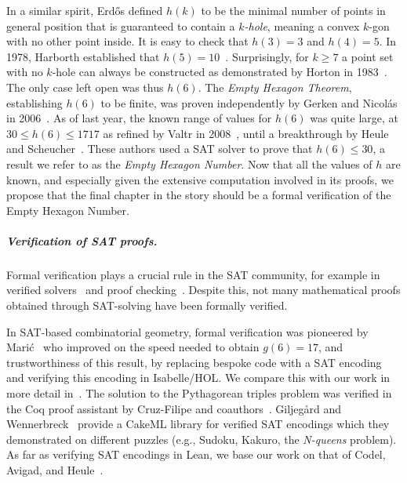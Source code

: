 In a similar spirit,
Erd\H{o}s defined $h(k)$
to be the minimal number of points in general position
that is guaranteed to contain a \emph{$k$-hole},
meaning a convex $k$-gon with no other point inside.
It is easy to check that $h(3) = 3$ and $h(4) = 5$.
In 1978, Harborth established that $h(5) = 10$~\cite{Harborth1978}.
Surprisingly, for $k \geq 7$ a point set with no $k$-hole
can always be constructed
as demonstrated by Horton in 1983~\cite{hortonSetsNoEmpty1983}.
The only case left open was thus $h(6)$.
The \emph{Empty Hexagon Theorem},
establishing $h(6)$ to be finite,
was proven independently by Gerken and Nicolás in 2006~\cite{gerkenEmptyConvexHexagons2008,nicolasEmptyHexagonTheorem2007}.
As of last year,
the known range of values for $h(6)$ was quite large,
at $30 \leq h(6) \leq 1717$
as refined by Valtr in 2008~\cite{valtr},
until a breakthrough by Heule and Scheucher~\cite{emptyHexagonNumber}.
These authors used a SAT solver
to prove that $h(6) \leq 30$,
a result we refer to as the \emph{Empty Hexagon Number}.
Now that all the values of $h$ are known,
and especially given the extensive computation involved in its proofs,
we propose that the final chapter in the story
should be a formal verification of the Empty Hexagon Number.

\subparagraph*{Verification of SAT proofs.}
Formal verification plays a crucial rule in the SAT community,
for example in verified solvers~\cite{10maric_formal_verification_modern_sat_solver_shallow_embedding_isabelle_hol,oeVersatVerifiedModern2012,skotam_creusat_2022}
and proof checking~\cite{lammichEfficientVerifiedSAT2020,tanVerifiedPropagationRedundancy2023}.
Despite this,
not many mathematical proofs obtained through SAT-solving
have been formally verified.

In SAT-based combinatorial geometry,
formal verification was pioneered by Marić~\cite{19maric_fast_formal_proof_erdos_szekeres_conjecture_convex_polygons_most_six_points}
who improved on the speed needed to obtain $g(6) = 17$,
and trustworthiness of this result,
by replacing bespoke code with a SAT encoding
and verifying this encoding in \textsf{Isabelle/HOL}.
We compare this with our work in more detail in~.
The solution to the Pythagorean triples problem
was verified in the \textsf{Coq} proof assistant
by Cruz-Filipe and coauthors~\cite{formalPythagoreanTriples,LPAR-21:Formally_Proving_Boolean_Pythagorean}.
Giljeg\r{a}rd and Wennerbreck~\cite{GilAndWennerbeck} provide a \textsf{CakeML} library
for verified SAT encodings
which they demonstrated on different puzzles
(e.g., Sudoku, Kakuro, the \emph{N-queens} problem).
As far as verifying SAT encodings in Lean,
we base our work on that of Codel, Avigad, and Heule~\cite{Cayden}.

